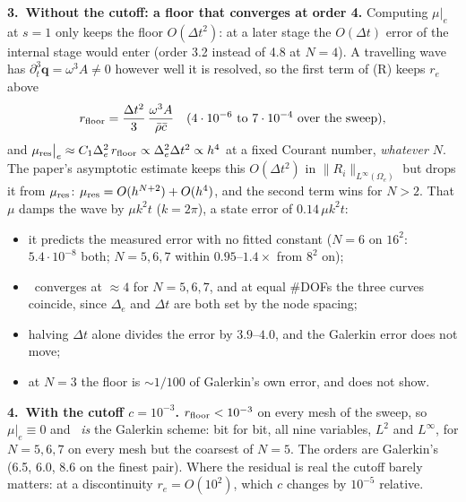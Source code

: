 \documentclass[10pt]{article}
\newcommand{\qq}{\bm{q}}
\newcommand{\Linf}[2]{\lVert #1\rVert_{L^\infty(#2)}}
\newcommand{\mres}{\mu_{\mathrm{res}}\big|_e}
\begin{document}
\newpage
\begin{minipage}[t]{0.52\textwidth}
\textbf{3.\ Without the cutoff: a floor that converges at order 4.}
Computing $\mu|_e$ at $s=1$ only keeps the floor $O(\Delta t^2)$: at a later stage the $O(\Delta t)$ error of the internal
stage would enter (order 3.2 instead of 4.8 at $N=4$). A travelling wave has $\partial_t^3\qq=\omega^3A\neq0$ however well it
is resolved, so the first term of (R) keeps $r_e$ above
\[
r_{\rm floor}=\frac{\Delta t^2}{3}\,\frac{\omega^3A}{\bar\rho\bar c}\quad(4\cdot10^{-6}\ \text{to}\ 7\cdot10^{-4}\ \text{over the sweep}),
\]
and $\mres\approx C_1\Delta_e^2\,r_{\rm floor}\propto\Delta_e^2\Delta t^2\propto h^4$ at a fixed Courant number, \emph{whatever $N$}.
The paper's asymptotic estimate keeps this $O(\Delta t^2)$ in $\Linf{R_i}{\Omega_e}$ but drops it from $\mu_{\rm res}$:
$\mu_{\rm res}=O(h^{N+2})+O(h^4)$, and the second term wins for $N>2$. That $\mu$ damps the wave by $\mu k^2t$ ($k=2\pi$), a state
error of $0.14\,\mu k^2t$:
\begin{itemize}[leftmargin=12pt]
\item it predicts the measured error with no fitted constant ($N=6$ on $16^2$: $5.4\cdot10^{-8}$ both;
$N=5,6,7$ within $0.95$--$1.4\times$ from $8^2$ on);
\item \dsgs\ converges at $\approx4$ for $N=5,6,7$, and at equal \#DOFs the three curves coincide, since $\Delta_e$ and
$\Delta t$ are both set by the node spacing;
\item halving $\Delta t$ alone divides the error by $3.9$--$4.0$, and the Galerkin error does not move;
\item at $N=3$ the floor is ${\sim}1/100$ of Galerkin's own error, and does not show.
\end{itemize}
\textbf{4.\ With the cutoff $c=10^{-3}$.} $r_{\rm floor}<10^{-3}$ on every mesh of the sweep, so $\mu|_e\equiv0$ and \dsgs\
\emph{is} the Galerkin scheme: bit for bit, all nine variables, $L^2$ and $L^\infty$, for $N=5,6,7$ on every mesh but the
coarsest of $N=5$. The orders are Galerkin's (6.5, 6.0, 8.6 on the finest pair). Where the residual is real the cutoff barely
matters: at a discontinuity $r_e=O(10^2)$, which $c$ changes by $10^{-5}$ relative.
\end{minipage}\hfill
\end{document}
